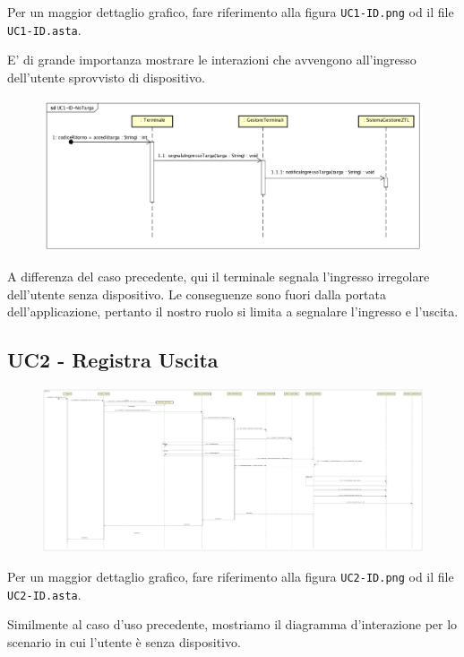 \documentclass[12pt, letterpaper]{article}
\begin{document}
\noindent
Per un maggior dettaglio grafico, fare riferimento alla figura 
\texttt{UC1-ID.png} od il file \texttt{UC1-ID.asta}.

\noindent
E' di grande importanza mostrare le interazioni che avvengono 
all'ingresso dell'utente sprovvisto di dispositivo.
\begin{figure}[H]
    \centering
    \includegraphics[scale=0.40]{UC1-ID-NoTarga}
\end{figure} 

\noindent
A differenza del caso precedente, qui il terminale segnala
l'ingresso irregolare dell'utente senza dispositivo. 
Le conseguenze sono fuori dalla portata dell'applicazione, 
pertanto il nostro ruolo si limita a segnalare l'ingresso e
l'uscita.

\subsection{UC2 - Registra Uscita}
\begin{figure}[H]
    \centering
    \includegraphics[scale=0.07]{UC2-ID}
\end{figure}

\noindent
Per un maggior dettaglio grafico, fare riferimento alla figura 
\texttt{UC2-ID.png} od il file \texttt{UC2-ID.asta}.

\noindent
Similmente al caso d'uso precedente, mostriamo il 
diagramma d'interazione per lo scenario in cui 
l'utente è senza dispositivo.
\end{document}
